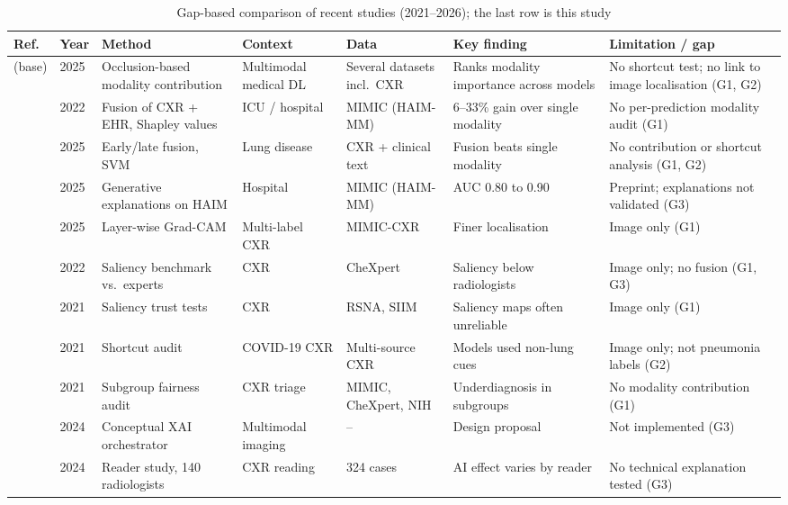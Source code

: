 \documentclass[conference]{IEEEtran}
\begin{document}
\begin{table}[!t]
\caption{Gap-based comparison of recent studies (2021--2026); the last row is this study}
\label{tab:lit}
\centering
\footnotesize
\setlength{\tabcolsep}{3pt}
\begin{tabular}{@{}p{1.2cm}p{0.6cm}p{2.9cm}p{2.0cm}p{2.4cm}p{3.1cm}p{3.6cm}@{}}
\toprule
Ref. & Year & Method & Context & Data & Key finding & Limitation / gap \\
\midrule
\cite{gapp2025modality} (base) & 2025 & Occlusion-based modality contribution & Multimodal medical DL & Several datasets incl.\ CXR & Ranks modality importance across models & No shortcut test; no link to image localisation (G1, G2) \\
\cite{soenksen2022haim} & 2022 & Fusion of CXR + EHR, Shapley values & ICU / hospital & MIMIC (HAIM-MM) & 6--33\% gain over single modality & No per-prediction modality audit (G1) \\
\cite{truong2025multimodal} & 2025 & Early/late fusion, SVM & Lung disease & CXR + clinical text & Fusion beats single modality & No contribution or shortcut analysis (G1, G2) \\
\cite{petridis2025xhaim} & 2025 & Generative explanations on HAIM & Hospital & MIMIC (HAIM-MM) & AUC 0.80 to 0.90 & Preprint; explanations not validated (G3) \\
\cite{kim2025layerwise} & 2025 & Layer-wise Grad-CAM & Multi-label CXR & MIMIC-CXR & Finer localisation & Image only (G1) \\
\cite{saporta2022saliency} & 2022 & Saliency benchmark vs.\ experts & CXR & CheXpert & Saliency below radiologists & Image only; no fusion (G1, G3) \\
\cite{arun2021trustworthiness} & 2021 & Saliency trust tests & CXR & RSNA, SIIM & Saliency maps often unreliable & Image only (G1) \\
\cite{degrave2021shortcuts} & 2021 & Shortcut audit & COVID-19 CXR & Multi-source CXR & Models used non-lung cues & Image only; not pneumonia labels (G2) \\
\cite{seyyed2021underdiagnosis} & 2021 & Subgroup fairness audit & CXR triage & MIMIC, CheXpert, NIH & Underdiagnosis in subgroups & No modality contribution (G1) \\
\cite{pahud2024orchestrating} & 2024 & Conceptual XAI orchestrator & Multimodal imaging & -- & Design proposal & Not implemented (G3) \\
\cite{yu2024heterogeneity} & 2024 & Reader study, 140 radiologists & CXR reading & 324 cases & AI effect varies by reader & No technical explanation tested (G3) \\

\end{tabular}
\end{table}
\end{document}
